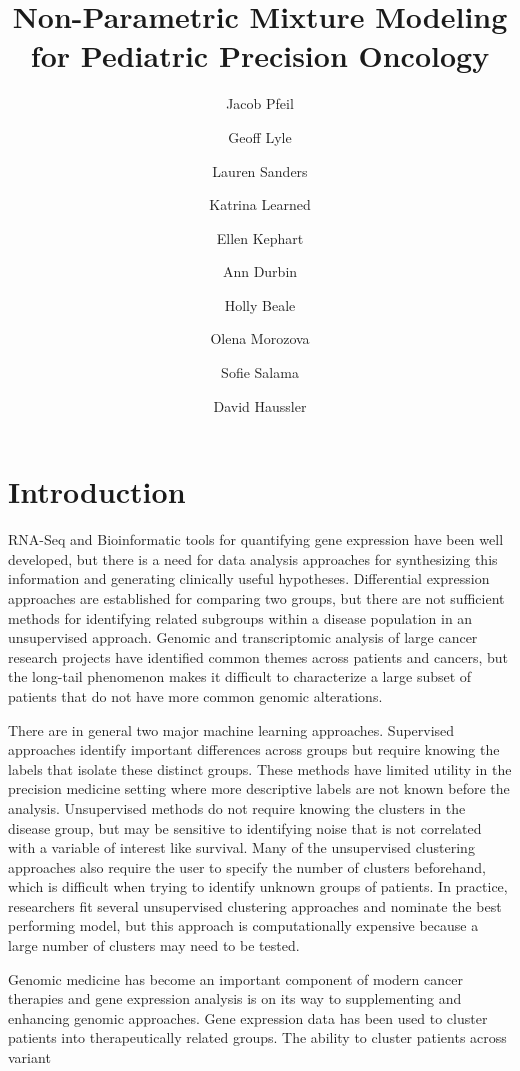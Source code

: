 \documentclass[fleqn,10pt]{wlscirep}
\title{Non-Parametric Mixture Modeling for Pediatric Precision Oncology}
\author[1,*]{Jacob Pfeil}
\author[1]{Geoff Lyle}
\author[1]{Lauren Sanders}
\author[1]{Katrina Learned}
\author[1]{Ellen Kephart}
\author[1]{Ann Durbin}
\author[1]{Holly Beale}
\author[1]{Olena Morozova}
\author[1]{Sofie Salama}
\author[1]{David Haussler}
\affil[1]{University of California, Santa Cruz, Biomolecular Engineering, Santa Cruz, 95064, United States}
\affil[*]{jpfeil@ucsc.edu}
\begin{document}
\flushbottom
\maketitle
%
%
\thispagestyle{empty}


\section*{Introduction}

RNA-Seq and Bioinformatic tools for quantifying gene expression have been well developed, but there is a need for data analysis approaches for synthesizing this information and generating clinically useful hypotheses. Differential expression approaches are established for comparing two groups, but there are not sufficient methods for identifying related subgroups within a disease population in an unsupervised approach. Genomic and transcriptomic analysis of large cancer research projects have identified common themes across patients and cancers, but the long-tail phenomenon makes it difficult to characterize a large subset of patients that do not have more common genomic alterations.

There are in general two major machine learning approaches. Supervised approaches identify important differences across groups but require knowing the labels that isolate these distinct groups. These methods have limited utility in the precision medicine setting where more descriptive labels are not known before the analysis. Unsupervised methods do not require knowing the clusters in the disease group, but may be sensitive to identifying noise that is not correlated with a variable of interest like survival. Many of the unsupervised clustering approaches also require the user to specify the number of clusters beforehand, which is difficult when trying to identify unknown groups of patients. In practice, researchers fit several unsupervised clustering approaches and nominate the best performing model, but this approach is computationally expensive because a large number of clusters may need to be tested. 

Genomic medicine has become an important component of modern cancer therapies and gene expression analysis is on its way to supplementing and enhancing genomic approaches. Gene expression data has been used to cluster patients into therapeutically related groups. The ability to cluster patients across variant
\end{document}
